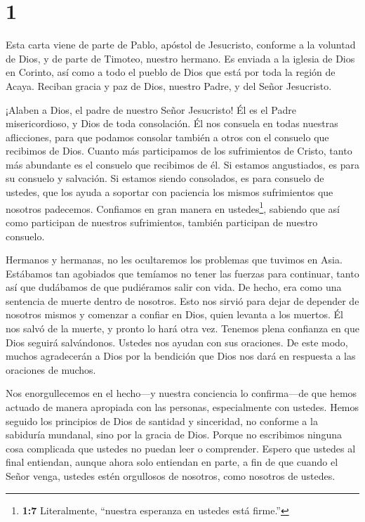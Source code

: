\hypertarget{section}{%
\section{1}\label{section}}

 Esta carta viene de parte de Pablo, apóstol de Jesucristo,
conforme a la voluntad de Dios, y de parte de Timoteo, nuestro hermano.
Es enviada a la iglesia de Dios en Corinto, así como a todo el pueblo de
Dios que está por toda la región de Acaya.  Reciban gracia y
paz de Dios, nuestro Padre, y del Señor Jesucristo.

 ¡Alaben a Dios, el padre de nuestro Señor Jesucristo! Él es
el Padre misericordioso, y Dios de toda consolación.  Él nos
consuela en todas nuestras aflicciones, para que podamos consolar
también a otros con el consuelo que recibimos de Dios. 
Cuanto más participamos de los sufrimientos de Cristo, tanto más
abundante es el consuelo que recibimos de él.  Si estamos
angustiados, es para su consuelo y salvación. Si estamos siendo
consolados, es para consuelo de ustedes, que los ayuda a soportar con
paciencia los mismos sufrimientos que nosotros padecemos. 
Confiamos en gran manera en ustedes\footnote{\textbf{1:7} Literalmente,
  ``nuestra esperanza en ustedes está firme.''}, sabiendo que así como
participan de nuestros sufrimientos, también participan de nuestro
consuelo.

 Hermanos y hermanas, no les ocultaremos los problemas que
tuvimos en Asia. Estábamos tan agobiados que temíamos no tener las
fuerzas para continuar, tanto así que dudábamos de que pudiéramos salir
con vida.  De hecho, era como una sentencia de muerte dentro
de nosotros. Esto nos sirvió para dejar de depender de nosotros mismos y
comenzar a confiar en Dios, quien levanta a los muertos. 
Él nos salvó de la muerte, y pronto lo hará otra vez. Tenemos plena
confianza en que Dios seguirá salvándonos.  Ustedes nos
ayudan con sus oraciones. De este modo, muchos agradecerán a Dios por la
bendición que Dios nos dará en respuesta a las oraciones de muchos.

 Nos enorgullecemos en el hecho---y nuestra conciencia lo
confirma---de que hemos actuado de manera apropiada con las personas,
especialmente con ustedes. Hemos seguido los principios de Dios de
santidad y sinceridad, no conforme a la sabiduría mundanal, sino por la
gracia de Dios.  Porque no escribimos ninguna cosa
complicada que ustedes no puedan leer o comprender. Espero que ustedes
al final entiendan,  aunque ahora solo entiendan en parte,
a fin de que cuando el Señor venga, ustedes estén orgullosos de
nosotros, como nosotros de ustedes.

